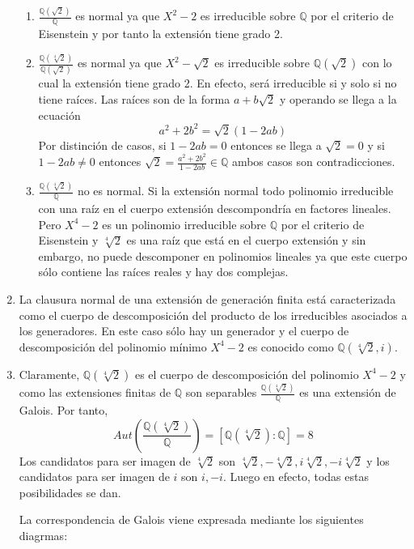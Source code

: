 \documentclass{article}
\theoremstyle{theorem-style}  %
\theoremstyle{definition-style}
\theoremstyle{example-style}
\begin{document}
\begin{enumerate}
\begin{enumerate}
\item $\frac{\mathbb{Q}(\sqrt{2})}{\mathbb{Q}}$ es normal ya que $X^2-2$ es irreducible sobre $\mathbb{Q}$ por el criterio de Eisenstein y por tanto la extensión tiene grado 2. 
\item $\frac{\mathbb{Q}(\sqrt[4]{2})}{\mathbb{Q}(\sqrt{2})}$ es normal ya que $X^2-\sqrt{2}$ es irreducible sobre $\mathbb{Q}(\sqrt{2})$ con lo cual la extensión tiene grado 2. En efecto, será irreducible si y solo si no tiene raíces. Las raíces son de la forma $a+b\sqrt{2}$ y operando se llega a la ecuación $$a^2+2b^2 = \sqrt{2}(1-2ab)$$ Por distinción de casos, si $1-2ab = 0$ entonces se llega a $\sqrt{2}  = 0$ y si $1-2ab \neq 0$ entonces $\sqrt{2} = \frac{a^2+2b^2}{1-2ab} \in \mathbb{Q}$ ambos casos son contradicciones. 
\item $\frac{\mathbb{Q}(\sqrt[4]{2})}{\mathbb{Q}}$ no es normal. Si la extensión normal todo polinomio irreducible con una raíz en el cuerpo extensión descompondría en factores lineales. Pero $X^4 - 2$ es un polinomio irreducible sobre $\mathbb{Q}$ por el criterio de Eisenstein y $\sqrt[4]{2}$ es una raíz que está en el cuerpo extensión y sin embargo, no puede descomponer en polinomios lineales ya que este cuerpo sólo contiene las raíces reales y hay dos complejas. 
\end{enumerate}

\item La clausura normal de una extensión de generación finita está caracterizada como el cuerpo de descomposición del producto de los irreducibles asociados a los generadores. En este caso sólo hay un generador y el cuerpo de descomposición del polinomio mínimo $X^4-2$ es conocido como $\mathbb{Q}(\sqrt[4]{2},i)$.

\item Claramente, $\mathbb{Q}(\sqrt[4]{2})$ es el cuerpo de descomposición del polinomio $X^4 - 2$ y como las extensiones finitas de $\mathbb{Q}$ son separables $\frac{\mathbb{Q}(\sqrt[4]{2})}{\mathbb{Q}}$ es una extensión de Galois. Por tanto, $$Aut(\frac{\mathbb{Q}(\sqrt[4]{2})}{\mathbb{Q}}) = [\mathbb{Q}(\sqrt[4]{2}):\mathbb{Q}] = 8$$ Los candidatos para ser imagen de $\sqrt[4]{2}$ son $\sqrt[4]{2},-\sqrt[4]{2},i\sqrt[4]{2},-i\sqrt[4]{2}$ y los candidatos para ser imagen de $i$ son $i,-i$. Luego en efecto, todas estas posibilidades se dan. 

La correspondencia de Galois viene expresada mediante los siguientes diagrmas:


\end{enumerate}
\end{document}
